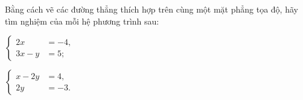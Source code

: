 \begin{practice}
\begin{questions}[series=SBT]
        \item Bằng cách vẽ các đường thẳng thích hợp trên cùng một mặt phẳng tọa độ, hãy tìm nghiệm của mỗi hệ phương trình sau:
        \begin{questions}
            \item
            $\left\{
            \begin{aligned}
                2x&=-4,\\
                3x-y&=5;
            \end{aligned}
            \right.$
            \item
            $\left\{
            \begin{aligned}
                x-2y&=4,\\
                2y&=-3.
            \end{aligned}
            \right.$
        \end{questions}
        \answerline
        \answerline
        \answerline
    \end{questions}
\end{practice}
